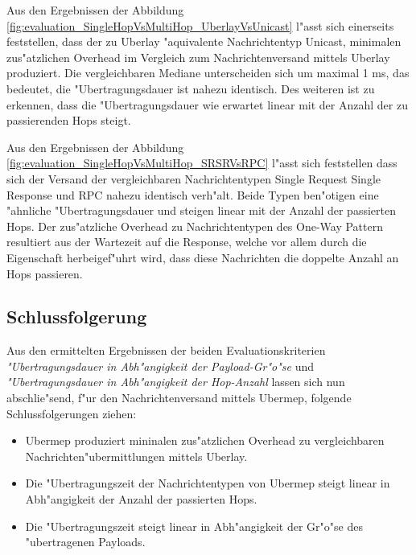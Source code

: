 Aus den Ergebnissen der Abbildung \ref{fig:evaluation_SingleHopVsMultiHop_UberlayVsUnicast} l"asst sich einerseits feststellen, dass der zu Uberlay "aquivalente Nachrichtentyp Unicast, minimalen zus"atzlichen Overhead im Vergleich zum Nachrichtenversand mittels Uberlay produziert. Die vergleichbaren Mediane unterscheiden sich um maximal 1 ms, das bedeutet, die "Uber\-tra\-gungs\-dauer ist nahezu identisch. Des weiteren ist zu erkennen, dass die "Uber\-tra\-gungs\-dauer wie erwartet linear mit der Anzahl der zu passierenden Hops steigt.

Aus den Ergebnissen der Abbildung \ref{fig:evaluation_SingleHopVsMultiHop_SRSRVsRPC} l"asst sich feststellen dass sich der Versand der vergleichbaren Nachrichtentypen Single Request Single Response und RPC nahezu identisch verh"alt. Beide Typen ben"otigen eine "ahnliche "Uber\-tra\-gungs\-dauer und steigen linear mit der Anzahl der passierten Hops. Der zus"atzliche Overhead zu Nachrichtentypen des One-Way Pattern resultiert aus der Wartezeit auf die Response, welche vor allem durch die Eigenschaft herbeigef"uhrt wird, dass diese Nachrichten die doppelte Anzahl an Hops passieren.

\subsection{Schlussfolgerung}

Aus den ermittelten Ergebnissen der beiden Evaluationskriterien \emph{"Ubertragungsdauer in Abh"angigkeit der Payload-Gr"o"se} und \emph{"Ubertragungsdauer in Abh"angigkeit der Hop-Anzahl} lassen sich nun abschlie"send, f"ur den Nachrichtenversand mittels Ubermep, folgende Schlussfolgerungen ziehen:

\begin{itemize}
\item Ubermep produziert mininalen zus"atzlichen Overhead zu vergleichbaren Nachrichten"ubermittlungen mittels Uberlay.
\item Die "Ubertragungszeit der Nachrichtentypen von Ubermep steigt linear in Abh"angigkeit der Anzahl der passierten Hops.
\item Die "Ubertragungszeit steigt linear in Abh"angigkeit der Gr"o"se des "uber\-tra\-genen Payloads.
\end{itemize}

